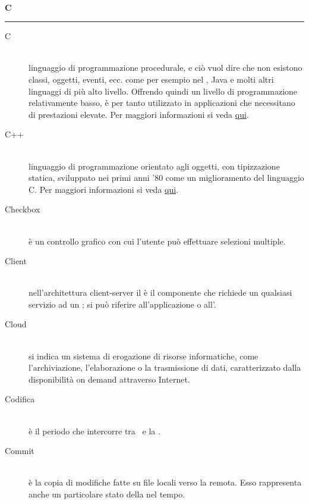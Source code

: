 \documentclass[12pt,a4paper]{article}
\begin{document}
\newpage

\begin{center}
\hfill\\
	\LARGE \textbf{C}
\hfill\\
\rule[15pt]{30pt}{0.5pt}
\end{center}

\begin{description}
\item[C]
\hfill\\ linguaggio di programmazione procedurale, e ciò vuol dire che non esistono classi, oggetti, eventi, ecc. come per esempio nel , Java e molti altri linguaggi di più alto livello. Offrendo quindi un livello di programmazione relativamente basso, è per tanto utilizzato in applicazioni che necessitano di prestazioni elevate. Per maggiori informazioni si veda \href{https://it.wikiversity.org/wiki/Linguaggio_C}{qui}.

\item[C++]
\hfill\\ linguaggio di programmazione orientato agli oggetti, con tipizzazione statica, sviluppato nei primi anni '80 come un miglioramento del linguaggio C. Per maggiori informazioni si veda \href{https://it.wikiversity.org/wiki/C\%2B\%2B}{qui}.

\item[Checkbox]
\hfill\\ è un controllo grafico con cui l'utente può effettuare selezioni multiple.

\item[Client]
\hfill\\nell'architettura client-server il  è il componente che richiede un qualsiasi servizio ad un ; si può riferire all'applicazione o all'.

\item[Cloud]
\hfill\\ si indica un sistema di erogazione di risorse informatiche, come l'archiviazione, l'elaborazione o la trasmissione di dati, caratterizzato dalla disponibilità on demand attraverso Internet.

\item[Codifica] 
\hfill\\ è il periodo che intercorre tra \RP\ e la \RQ.

\item[Commit] 
\hfill\\ è la copia di modifiche fatte su file locali verso la  remota. Esso rappresenta anche un particolare stato della  nel tempo.


\end{description}
\end{document}
